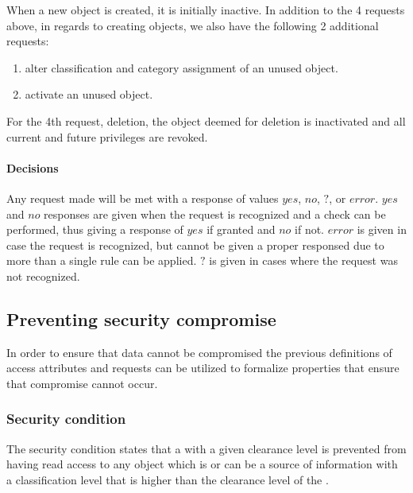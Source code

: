 When a new object is created, it is initially inactive.
In addition to the 4 requests above, in regards to creating objects, we also have the following 2 additional requests:
\begin{enumerate}
  \item alter classification and category assignment of an unused object.
  \item activate an unused object.
\end{enumerate}

For the 4th request, deletion, the object deemed for deletion is inactivated and all current and future privileges are revoked.

\paragraph{Decisions}
Any request made will be met with a response of values $yes$, $no$, $?$, or $error$.
$yes$ and $no$ responses are given when the request is recognized and a check can be performed, thus giving a response of $yes$ if granted and $no$ if not.
$error$ is given in case the request is recognized, but cannot be given a proper responsed due to more than a single rule can be applied.
$?$ is given in cases where the request was not recognized.
 
\subsection{Preventing security compromise}\label{bellap:properties}
In order to ensure that data cannot be compromised the previous definitions of access attributes and requests can be utilized to formalize properties that ensure that compromise cannot occur.

\subsubsection{Security condition}
The security condition states that a \principal{} with a given clearance level is prevented from having read access to any object which is or can be a source of information with a classification level that is higher than the clearance level of the \principal{}.


